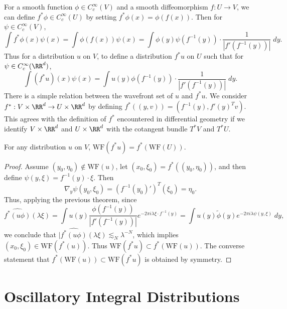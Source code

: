 For a smooth function $\phi \in C_c^\infty(V)$ and a smooth diffeomorphism $f: U \to V$, we can define $f^* \phi \in C_c^\infty(U)$ by setting $f^* \phi(x) = \phi(f(x))$. Then for $\psi \in C_c^\infty(V)$,
%
\[ \int f^* \phi(x) \psi(x) = \int \phi(f(x)) \psi(x) = \int \phi(y) \psi(f^{-1}(y)) \cdot \frac{1}{|f'(f^{-1}(y))|} \; dy. \]
%
Thus for a distribution $u$ on $V$, to define a distribution $f^* u$ on $U$ such that for $\psi \in C_c^\infty(\RR^d)$,
%
\[ \int (f^* u)(x) \psi(x) = \int u(y) \phi(f^{-1}(y)) \cdot \frac{1}{|f'(f^{-1}(y))|}\; dy. \]
%
There is a simple relation between the wavefront set of $u$ and $f^* u$. We consider $f^*: V \times \RR^d \to U \times \RR^d$ by defining $f^*((y,v)) = (f^{-1}(y), f'(y)^T v)$. This agrees with the definition of $f^*$ encountered in differential geometry if we identify $V \times \RR^d$ and $U \times \RR^d$ with the cotangent bundle $T^* V$ and $T^* U$.

\begin{theorem}
    For any distribution $u$ on $V$, $\text{WF}(f^* u) = f^*(\text{WF}(U))$.
\end{theorem}
\begin{proof}
    Assume $(y_0,\eta_0) \not \in \text{WF}(u)$, let $(x_0,\xi_0) = f^*((y_0,\eta_0))$, and then define $\psi(y,\xi) = f^{-1}(y) \cdot \xi$. Then
    \[ \nabla_y \psi(y_0,\xi_0) = (f^{-1}(y_0)')^T(\xi_0) = \eta_0. \]
    Thus, applying the previous theorem, since
    \[ \widehat{f^*(u \phi)}(\lambda \xi) = \int u(y) \frac{\phi(f^{-1}(y))}{|f'(f^{-1}(y))|} e^{-2 \pi i \lambda \xi \cdot f^{-1}(y)} = \int u(y) \tilde{\phi}(y) e^{-2 \pi i \lambda \psi(y,\xi)}\; dy, \]
    we conclude that $|\widehat{f^*(u \phi)}(\lambda \xi) \lesssim_N \lambda^{-N}$, which implies $(x_0,\xi_0) \in \text{WF}(f^*(u))$. Thus $\text{WF}(f^* u) \subset f^*(\text{WF}(u))$. The converse statement that $f^*(\text{WF}(u)) \subset \text{WF}(f^* u)$ is obtained by symmetry.
\end{proof}

\section{Oscillatory Integral Distributions}

